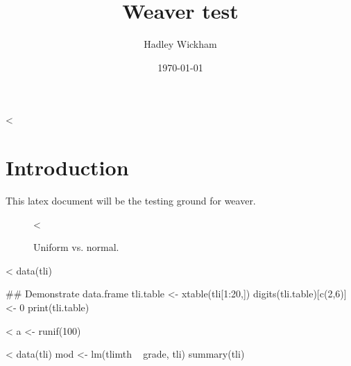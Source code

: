 \documentclass[11pt]{report}
\title{Weaver test}
\author{Hadley Wickham}
\date{\today}
\begin{document}
\maketitle

<%

\chapter{Introduction}

This latex document will be the testing ground for weaver.

\begin{figure}[h!]
<%
\caption{Uniform vs. normal.}
\label{est:together}
\end{figure}

<%
 data(tli)
 
 ## Demonstrate data.frame
 tli.table <- xtable(tli[1:20,])
 digits(tli.table)[c(2,6)] <- 0
 print(tli.table)

<%
  a <- runif(100)

<%
	data(tli)
	mod <- lm(tlimth ~ grade, tli)
	summary(tli)
\end{document}
